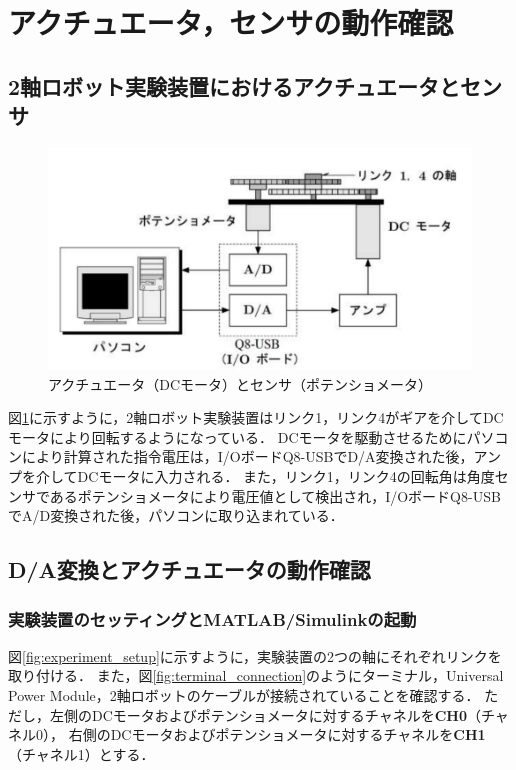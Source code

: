 \section{アクチュエータ，センサの動作確認}

\subsection{2軸ロボット実験装置におけるアクチュエータとセンサ}

\begin{figure}[H]
    \centering
    \includegraphics[width=0.8\linewidth]{figure/actuator_sensor.pdf}
    \caption{アクチュエータ（DCモータ）とセンサ（ポテンショメータ）}
    \label{fig:actuator_sensor}
\end{figure}

図\ref{fig:actuator_sensor}に示すように，2軸ロボット実験装置はリンク1，リンク4がギアを介してDCモータにより回転するようになっている．
DCモータを駆動させるためにパソコンにより計算された指令電圧は，I/OボードQ8-USBでD/A変換された後，アンプを介してDCモータに入力される．
また，リンク1，リンク4の回転角は角度センサであるポテンショメータにより電圧値として検出され，I/OボードQ8-USBでA/D変換された後，パソコンに取り込まれている．

\subsection{D/A変換とアクチュエータの動作確認}
\subsubsection{実験装置のセッティングと\textbf{MATLAB}/Simulinkの起動}

図\ref{fig:experiment_setup}に示すように，実験装置の2つの軸にそれぞれリンクを取り付ける．
また，図\ref{fig:terminal_connection}のようにターミナル，Universal Power Module，2軸ロボットのケーブルが接続されていることを確認する．
ただし，左側のDCモータおよびポテンショメータに対するチャネルを\textbf{CH0}（チャネル0），
右側のDCモータおよびポテンショメータに対するチャネルを\textbf{CH1}（チャネル1）とする．


